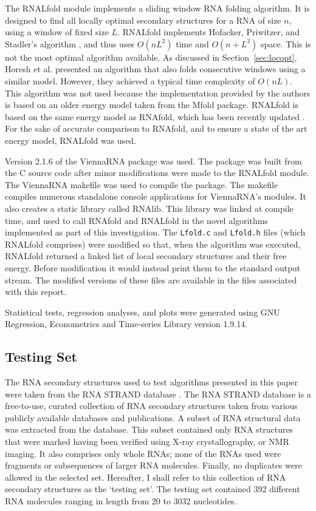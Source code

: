 \documentclass{cshonours}
\begin{document}
The RNALfold module implements a sliding window RNA folding algorithm. It is designed to find all locally optimal secondary structures for a RNA of size $n$, using a window of fixed size $L$. RNALfold implements Hofacker, Priwitzer, and Stadler's algorithm \cite{hofacker2004prediction}, and thus uses $O(nL^2)$ time and $O(n + L^2)$ space. This is not the most optimal algorithm available. As discussed in Section~\ref{sec:locopt}, Horesh et al. \cite{horesh2009rnaslider} presented an algorithm that also folds consecutive windows using a similar model. However, they achieved a typical time complexity of $O(nL)$. This algorithm was not used because the implementation provided by the authors is based on an older energy model taken from the Mfold \cite{zuker2003mfold} package. RNALfold is based on the same energy model as RNAfold, which has been recently updated \cite{lorenz2011viennarna}. For the sake of accurate comparison to RNAfold, and to ensure a state of the art energy model, RNALfold was used.

Version 2.1.6 of the ViennaRNA package was used. The package was built from the C source code after minor modifications were made to the RNALfold module. The ViennaRNA makefile was used to compile the package. The makefile compiles numerous standalone console applications for ViennaRNA's modules. It also creates a static library called RNAlib. This library was linked at compile time, and used to call RNAfold and RNALfold in the novel algorithms implemented as part of this investigation. The \texttt{Lfold.c} and \texttt{Lfold.h} files (which RNALfold comprises) were modified so that, when the algorithm was executed, RNALfold returned a linked list of local secondary structures and their free energy. Before modification it would instead print them to the standard output stream. The modified versions of these files are available in the files associated with this report.

Statistical tests, regression analyses, and plots were generated using GNU Regression, Econometrics and Time-series Library \cite{baiocchi2003gretl} version 1.9.14.


\subsection{Testing Set}
The RNA secondary structures used to test algorithms presented in this paper were taken from the RNA STRAND database \cite{andronescu2008rna}. The RNA STRAND database is a free-to-use, curated collection of RNA secondary structures taken from various publicly available databases and publications. A subset of RNA structural data was extracted from the database. This subset contained only RNA structures that were marked having been verified using X-ray crystallography, or NMR imaging. It also comprises only whole RNAs; none of the RNAs used were fragments or subsequences of larger RNA molecules. Finally, no duplicates were allowed in the selected set. Hereafter, I shall refer to this collection of RNA secondary structures as the `testing set'. The testing set contained 392 different RNA molecules ranging in length from 20 to 3032 nucleotides.
\end{document}
